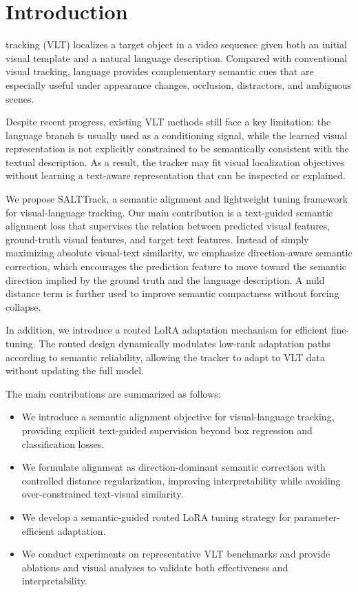 \section{Introduction}
 tracking (VLT) localizes a target object in a video sequence given both an initial visual template and a natural language description. Compared with conventional visual tracking, language provides complementary semantic cues that are especially useful under appearance changes, occlusion, distractors, and ambiguous scenes.

Despite recent progress, existing VLT methods still face a key limitation: the language branch is usually used as a conditioning signal, while the learned visual representation is not explicitly constrained to be semantically consistent with the textual description. As a result, the tracker may fit visual localization objectives without learning a text-aware representation that can be inspected or explained.

We propose SALTTrack, a semantic alignment and lightweight tuning framework for visual-language tracking. Our main contribution is a text-guided semantic alignment loss that supervises the relation between predicted visual features, ground-truth visual features, and target text features. Instead of simply maximizing absolute visual-text similarity, we emphasize direction-aware semantic correction, which encourages the prediction feature to move toward the semantic direction implied by the ground truth and the language description. A mild distance term is further used to improve semantic compactness without forcing collapse.

In addition, we introduce a routed LoRA adaptation mechanism for efficient fine-tuning. The routed design dynamically modulates low-rank adaptation paths according to semantic reliability, allowing the tracker to adapt to VLT data without updating the full model.

The main contributions are summarized as follows:
\begin{itemize}
    \item We introduce a semantic alignment objective for visual-language tracking, providing explicit text-guided supervision beyond box regression and classification losses.
    \item We formulate alignment as direction-dominant semantic correction with controlled distance regularization, improving interpretability while avoiding over-constrained text-visual similarity.
    \item We develop a semantic-guided routed LoRA tuning strategy for parameter-efficient adaptation.
    \item We conduct experiments on representative VLT benchmarks and provide ablations and visual analyses to validate both effectiveness and interpretability.
\end{itemize}

